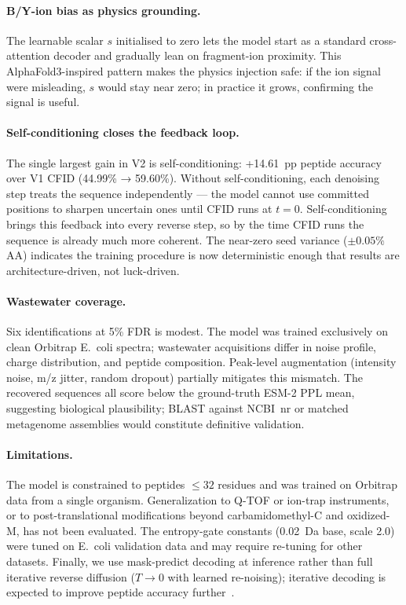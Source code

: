 \documentclass[11pt]{article}
\begin{document}
\paragraph{B/Y-ion bias as physics grounding.}
The learnable scalar $s$ initialised to zero lets the model start as a standard
cross-attention decoder and gradually lean on fragment-ion proximity. This
AlphaFold3-inspired pattern makes the physics injection safe: if the ion signal
were misleading, $s$ would stay near zero; in practice it grows, confirming the
signal is useful.

\paragraph{Self-conditioning closes the feedback loop.}
The single largest gain in V2 is self-conditioning: +14.61~pp peptide accuracy over
V1 CFID (44.99\% → 59.60\%). Without self-conditioning, each denoising step treats
the sequence independently --- the model cannot use committed positions to sharpen
uncertain ones until CFID runs at $t=0$. Self-conditioning brings this feedback into
every reverse step, so by the time CFID runs the sequence is already much more
coherent. The near-zero seed variance ($\pm0.05\%$ AA) indicates the training
procedure is now deterministic enough that results are architecture-driven, not
luck-driven.

\paragraph{Wastewater coverage.}
Six identifications at 5\% FDR is modest. The model was trained exclusively on
clean Orbitrap E.~coli spectra; wastewater acquisitions differ in noise profile,
charge distribution, and peptide composition. Peak-level augmentation (intensity
noise, m/z jitter, random dropout) partially mitigates this mismatch. The recovered
sequences all score below the ground-truth ESM-2 PPL mean, suggesting biological
plausibility; BLAST against NCBI~nr or matched metagenome assemblies would constitute
definitive validation.

\paragraph{Limitations.}
The model is constrained to peptides $\leq\!32$ residues and was trained on Orbitrap
data from a single organism. Generalization to Q-TOF or ion-trap instruments, or to
post-translational modifications beyond carbamidomethyl-C and oxidized-M, has not been
evaluated. The entropy-gate constants (0.02~Da base, scale 2.0) were tuned on E.~coli
validation data and may require re-tuning for other datasets. Finally, we use
mask-predict decoding at inference rather than full iterative reverse diffusion ($T\to0$
with learned re-noising); iterative decoding is expected to improve peptide accuracy
further~\cite{primenovo}.
\end{document}
